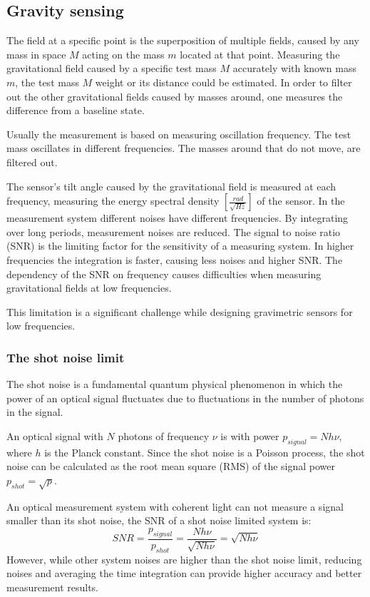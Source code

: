 \documentclass[\main/master.tex]{subfiles}
\begin{document}
\subsection{Gravity sensing}
The field at a specific point is the superposition of multiple fields, caused by any mass in space $M$ acting on the mass $m$ located at that point. Measuring the gravitational field caused by a specific test mass $M$ accurately with known mass $m$, the test mass $M$ weight or its distance could be estimated. In order to filter out the other gravitational fields caused by masses around, one measures the difference from a baseline state.
\par\noindent
Usually the measurement is based on measuring oscillation frequency. The test mass oscillates in different frequencies. The masses around that do not move, are filtered out.
\par\noindent
The sensor's tilt angle caused by the gravitational field is measured at each frequency, measuring the energy spectral density $[\frac{rad}{\sqrt{Hz}}]$ of the sensor.
In the measurement system different noises have different frequencies. By integrating over long periods, measurement noises are reduced. The signal to noise ratio (SNR) is the limiting factor for the sensitivity of a measuring system. In higher frequencies the integration is faster, causing less noises and higher SNR.
The dependency of the SNR on frequency causes difficulties when measuring gravitational fields at low frequencies.
\par\noindent
This limitation is a significant challenge while designing gravimetric sensors for low frequencies.

\subsubsection{The shot noise limit}
The shot noise is a fundamental quantum physical phenomenon in which the power of an optical signal fluctuates due to fluctuations in the number of photons in the signal. 
\par\noindent
An optical signal with $N$ photons of frequency $\nu$ is with power $p_{signal} = N h \nu$, where $h$ is the Planck constant. Since the shot noise is a Poisson process, the shot noise can be calculated as the root mean square (RMS) of the signal power $p_{shot} = \sqrt{p}$.
\par\noindent
An optical measurement system with coherent light can not measure a signal smaller than its shot noise, the SNR of a shot noise limited system is:
\begin{equation}
SNR = \frac{p_{signal}}{p_{shot}} =\frac{N h \nu}{\sqrt{N h \nu}} = \sqrt{N h \nu}    \label{eqn:shot_noise}
\end{equation}
However, while other system noises are higher than the shot noise limit, reducing noises and averaging the time integration can provide higher accuracy and better measurement results. 
\end{document}
